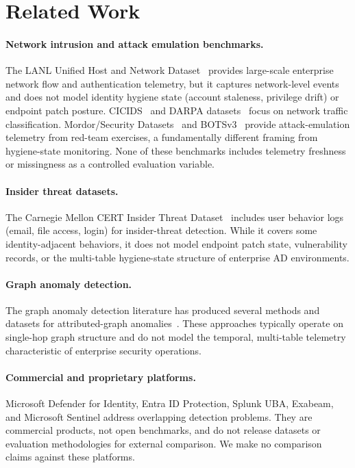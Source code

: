 
\section{Related Work}
\label{sec:related}

\paragraph{Network intrusion and attack emulation benchmarks.}
The LANL Unified Host and Network Dataset~\cite{kent2015lanl} provides large-scale
enterprise network flow and authentication telemetry, but it captures network-level
events and does not model identity hygiene state (account staleness, privilege
drift) or endpoint patch posture. CICIDS~\cite{sharafaldin2018cicids} and DARPA
datasets~\cite{darpa_tc_2018} focus on network traffic classification. Mordor/Security
Datasets~\cite{rodriguez2019mordor} and BOTSv3~\cite{splunk_botsv3} provide
attack-emulation telemetry
from red-team exercises, a fundamentally different framing from hygiene-state
monitoring. None of these benchmarks includes telemetry freshness or missingness as
a controlled evaluation variable.

\paragraph{Insider threat datasets.}
The Carnegie Mellon CERT Insider Threat Dataset~\cite{glasser2013cert} includes user
behavior logs (email, file access, login) for insider-threat detection. While it
covers some identity-adjacent behaviors, it does not model endpoint patch state,
vulnerability records, or the multi-table hygiene-state structure of enterprise AD
environments.

\paragraph{Graph anomaly detection.}
The graph anomaly detection literature has produced several methods and datasets for
attributed-graph anomalies~\cite{ding2019dominant,liu2024pygod}. These approaches
typically operate on single-hop graph structure and do not model the temporal,
multi-table telemetry characteristic of enterprise security operations.

\paragraph{Commercial and proprietary platforms.}
Microsoft Defender for Identity, Entra ID Protection, Splunk UBA, Exabeam, and
Microsoft Sentinel address overlapping detection problems. They are commercial
products, not open benchmarks, and do not release datasets or evaluation
methodologies for external comparison. We make no comparison claims against these
platforms.

